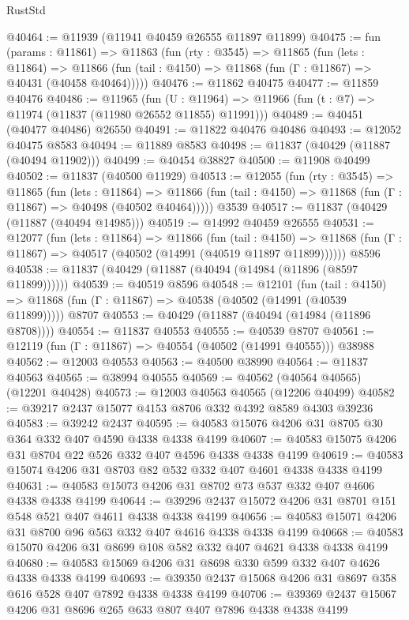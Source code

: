\begin{lexlean}{RustStd}
\begin{coremodule}
{\begin{coremodule}
{{{{{{{{{{{{{{{{{{{{{{{{{{{{{{{{{{{{{{{{{{{{{{{{{{@40464 := @11939 (@11941 @40459 @26555 @11897 @11899)
@40475 := fun (params : @11861) =>
  @11863
    (fun (rty : @3545) =>
    @11865
      (fun (lets : @11864) =>
      @11866 (fun (tail : @4150) => @11868 (fun (Γ : @11867) => @40431 (@40458 @40464)))))
@40476 := @11862 @40475
@40477 := @11859 @40476
@40486 := @11965
    (fun (U : @11964) => @11966 (fun (t : @7) => @11974 (@11837 (@11980 @26552 @11855) @11991)))
@40489 := @40451 (@40477 @40486) @26550
@40491 := @11822 @40476 @40486
@40493 := @12052 @40475 @8583
@40494 := @11889 @8583
@40498 := @11837 (@40429 (@11887 (@40494 @11902)))
@40499 := @40454 @38827
@40500 := @11908 @40499
@40502 := @11837 (@40500 @11929)
@40513 := @12055
    (fun (rty : @3545) =>
    @11865
      (fun (lets : @11864) =>
      @11866 (fun (tail : @4150) => @11868 (fun (Γ : @11867) => @40498 (@40502 @40464)))))
    @3539
@40517 := @11837 (@40429 (@11887 (@40494 @14985)))
@40519 := @14992 @40459 @26555
@40531 := @12077
    (fun (lets : @11864) =>
    @11866
      (fun (tail : @4150) =>
      @11868 (fun (Γ : @11867) => @40517 (@40502 (@14991 (@40519 @11897 @11899))))))
    @8596
@40538 := @11837 (@40429 (@11887 (@40494 (@14984 (@11896 (@8597 @11899))))))
@40539 := @40519 @8596
@40548 := @12101
    (fun (tail : @4150) => @11868 (fun (Γ : @11867) => @40538 (@40502 (@14991 (@40539 @11899)))))
    @8707
@40553 := @40429 (@11887 (@40494 (@14984 (@11896 @8708))))
@40554 := @11837 @40553
@40555 := @40539 @8707
@40561 := @12119 (fun (Γ : @11867) => @40554 (@40502 (@14991 @40555))) @38988
@40562 := @12003 @40553
@40563 := @40500 @38990
@40564 := @11837 @40563
@40565 := @38994 @40555
@40569 := @40562 (@40564 @40565) (@12201 @40428)
@40573 := @12003 @40563 @40565 (@12206 @40499)
@40582 := @39217 @2437 @15077 @4153 @8706 @332 @4392 @8589 @4303 @39236
@40583 := @39242 @2437
@40595 := @40583 @15076 @4206 @31 @8705 @30 @364 @332 @407 @4590 @4338 @4338 @4199
@40607 := @40583 @15075 @4206 @31 @8704 @22 @526 @332 @407 @4596 @4338 @4338 @4199
@40619 := @40583 @15074 @4206 @31 @8703 @82 @532 @332 @407 @4601 @4338 @4338 @4199
@40631 := @40583 @15073 @4206 @31 @8702 @73 @537 @332 @407 @4606 @4338 @4338 @4199
@40644 := @39296 @2437 @15072 @4206 @31 @8701 @151 @548 @521 @407 @4611 @4338 @4338 @4199
@40656 := @40583 @15071 @4206 @31 @8700 @96 @563 @332 @407 @4616 @4338 @4338 @4199
@40668 := @40583 @15070 @4206 @31 @8699 @108 @582 @332 @407 @4621 @4338 @4338 @4199
@40680 := @40583 @15069 @4206 @31 @8698 @330 @599 @332 @407 @4626 @4338 @4338 @4199
@40693 := @39350 @2437 @15068 @4206 @31 @8697 @358 @616 @528 @407 @7892 @4338 @4338 @4199
@40706 := @39369 @2437 @15067 @4206 @31 @8696 @265 @633 @807 @407 @7896 @4338 @4338 @4199
}}}}}}}}}}}}}}}}}}}}}}}}}}}}}}}}}}}}}}}}}}}}}}}}}}
\end{coremodule}}
\end{coremodule}
\end{lexlean}
